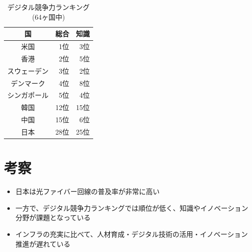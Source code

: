 \documentclass[a4paper,11pt,dvipdfmx]{ujarticle}
\begin{document}
\begin{table}[htbp]
    \centering
    \caption{デジタル競争力ランキング(64ヶ国中)}
    \label{tbl:利用状況}

    \begin{tabular}{|c|r|r|}
    \hline
        国 & 総合 & 知識 \\
        \hline
        米国 & 1位 & 3位 \\
        \hline
        香港 & 2位 & 5位 \\
        \hline
        スウェーデン & 3位 & 2位 \\
        \hline
        デンマーク & 4位 & 8位 \\
        \hline
        シンガポール & 5位 & 4位 \\
        \hline
        \hline
        韓国 & 12位 & 15位 \\
        \hline 
        中国 & 15位 & 6位 \\
        \hline
        \hline
        日本 & 28位 & 25位 \\
        \hline
    \end{tabular}
\end{table}





\section{考察}
\begin{itemize}
    \item 日本は光ファイバー回線の普及率が非常に高い
    \item 一方で、デジタル競争力ランキングでは順位が低く、知識やイノベーション分野が課題となっている
    \item インフラの充実に比べて、人材育成・デジタル技術の活用・イノベーション推進が遅れている
\end{itemize}
%

%


\end{document}
